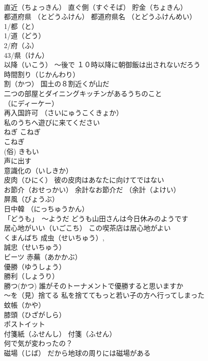 \documentclass[8pt]{extreport}
\begin{document}
\begin{CJK}{UTF8}{min}
\\	直近（ちょっきん） 直ぐ側（すぐそば） 貯金（ちょきん）
\\	都道府県 （とどうふけん） 都道府県名 （とどうふけんめい） 
\\	1/都（と） 
\\	1/道（どう） 
\\	2/府（ふ） 
\\	43/県（けん）
\\	以降（いこう） ～後で １０時以降に朝御飯は出されないだろう
\\	時間割り（じかんわり）
\\	割（かつ） 国土の８割近くが山だ
\\	二つの部屋とダイニングキッチンがあるうちのこと	
\\	（にディーケー）
\\	再入国許可 （さいにゅうこくきょか）
\\	私のうちへ遊びに来てください
\\	ねぎ こねぎ
\\	こねぎ
\\	(俗)	きもい
\\	声に出す
\\	意識化の（いしきか）
\\	皮肉（ひにく） 彼の皮肉はあなたに向けてではない
\\	お節介（おせっかい） 余計なお節介だ （余計（よけい） 
\\	屏風（びょうぶ）
\\	日中韓 （にっちゅうかん）
\\	「どうも」　～ようだ どうも山田さんは今日休みのようです
\\	居心地がいい（いごこち） この喫茶店は居心地がよい
\\	くまんばち 成虫（せいちゅう）,
\\	誠忠（せいちゅう） 
\\	ビーツ 赤蕪（あかかぶ）
\\	優勝（ゆうしょう） 
\\	勝利（しょうり）
\\	勝つ(かつ) 誰がそのトーナメントで優勝すると思いますか
\\	～を（見）捨てる 私を捨ててもっと若い子の方へ行ってしまった
\\	蚊帳（かや）
\\	膝頭（ひざがしら）
\\	ポストイット 
\\	付箋紙（ふせんし） 付箋（ふせん） 
\\	何で気が変わったの？
\\	磁場（じば） だから地球の周りには磁場がある

\end{CJK}
\end{document}
